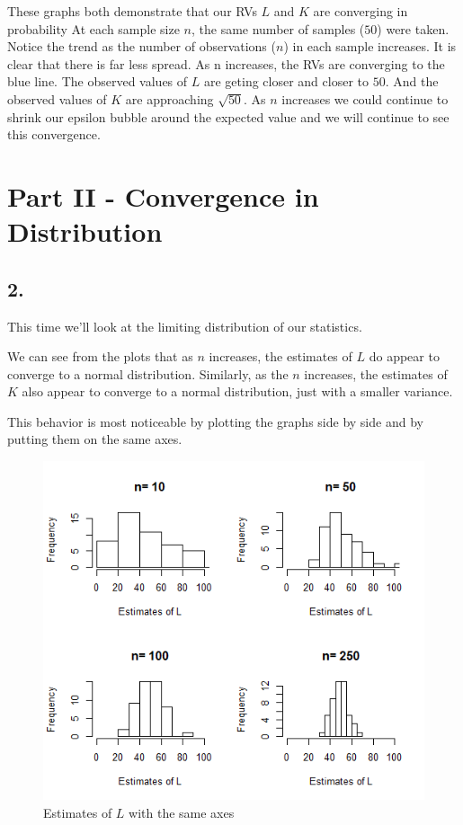\documentclass[12pt]{article}
\begin{document}
These graphs both demonstrate that our RVs $L$ and $K$ are converging in probability At each sample size $n$, the same number of samples ($50$) were taken.  Notice the trend as the number of observations ($n$) in each sample increases. It is clear that there is far less spread. As n increases, the RVs are converging to the blue line. The observed values of $L$ are geting closer and closer to $50$. And the observed values of $K$ are approaching $\sqrt{50}$.  As $n$ increases we could continue to shrink our epsilon bubble around the expected value and we will continue to see this convergence.


\section{Part II - Convergence in Distribution}

\subsection{2.}
This time we’ll look at the limiting distribution of our statistics.

\bigskip
\noindent
We can see from the plots that as $n$ increases, the estimates of $L$ do appear to converge to a normal distribution. Similarly, as the $n$ increases, the estimates of $K$ also appear to converge to a normal distribution, just with a smaller variance. 

This behavior is most noticeable by plotting the graphs side by side and by putting them on the same axes.

\begin{figure}[H]
	\centering
	\includegraphics[scale = 0.6]{img/problem2/Problem_2_L.png}
	\caption{Estimates of $L$ with the same axes}
\end{figure}
\end{document}

